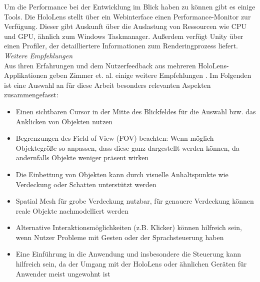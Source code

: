 Um die Performance bei der Entwicklung im Blick haben zu können gibt es einige Tools. Die HoloLens stellt über ein Webinterface einen Performance-Monitor zur Verfügung. Dieser gibt Auskunft über die Auslastung von Ressourcen wie CPU und GPU, ähnlich zum Windows Taskmanager. Außerdem verfügt Unity über einen Profiler, der detailliertere Informationen zum Renderingprozess liefert.\\

\textit{Weitere Empfehlungen}\\
Aus ihren Erfahrungen und dem Nutzerfeedback aus mehreren HoloLens-Applikationen geben Zimmer et. al. einige weitere Empfehlungen \cite{Zimmer17}. Im Folgenden ist eine Auswahl an für diese Arbeit besonders relevanten Aspekten zusammengefasst:
\begin{itemize}[topsep=-2px]
	\setlength{\itemsep}{-1pt}
	\singlespacing
	\item Einen sichtbaren Cursor in der Mitte des Blickfeldes für die Auswahl bzw. das Anklicken von Objekten nutzen
	\item Begrenzungen des Field-of-View (FOV) beachten: Wenn möglich Objektegröße so anpassen, dass diese ganz dargestellt werden können, da andernfalls Objekte weniger präsent wirken
	\item Die Einbettung von Objekten kann durch visuelle Anhaltspunkte wie Verdeckung oder Schatten unterstützt werden
	\item Spatial Mesh für grobe Verdeckung nutzbar, für genauere Verdeckung können reale Objekte nachmodelliert werden 
	\item Alternative Interaktionsmöglichkeiten (z.B. Klicker) können hilfreich sein, wenn Nutzer Probleme mit Gesten oder der Sprachsteuerung haben
	\item Eine Einführung in die Anwendung und insbesondere die Steuerung kann hilfreich sein, da der Umgang mit der HoloLens oder ähnlichen Geräten für Anwender meist ungewohnt ist
\end{itemize}
\vspace{6px}



